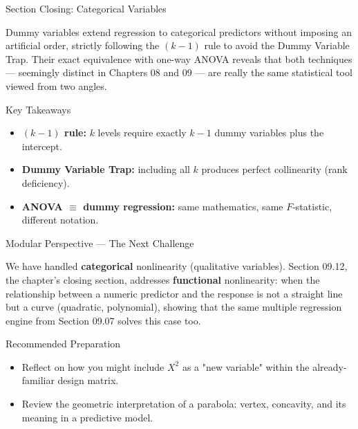 \documentclass[10pt, aspectratio=169]{beamer}
\begin{document}
\begin{frame}{Section Closing: Categorical Variables}
  \begin{reflexion}
    Dummy variables extend regression to categorical predictors without imposing an artificial order, strictly following the $(k-1)$ rule to avoid the Dummy Variable Trap. Their exact equivalence with one-way ANOVA reveals that both techniques --- seemingly distinct in Chapters 08 and 09 --- are really the same statistical tool viewed from two angles.
  \end{reflexion}

  \vspace{0.2cm}
  \pause
  \begin{block}{Key Takeaways}
    \begin{itemize}\itemsep=0.08cm
      \item \textbf{$(k-1)$ rule:} $k$ levels require exactly $k-1$ dummy variables plus the intercept.
      \item \textbf{Dummy Variable Trap:} including all $k$ produces perfect collinearity (rank deficiency).
      \item \textbf{ANOVA $\equiv$ dummy regression:} same mathematics, same $F$-statistic, different notation.
    \end{itemize}
  \end{block}
\end{frame}

\begin{frame}{Modular Perspective --- The Next Challenge}
  \scriptsize
  \begin{retoclase}
    We have handled \textbf{categorical} nonlinearity (qualitative variables). Section 09.12, the chapter's closing section, addresses \textbf{functional} nonlinearity: when the relationship between a numeric predictor and the response is not a straight line but a curve (quadratic, polynomial), showing that the same multiple regression engine from Section 09.07 solves this case too.
  \end{retoclase}

  \vspace{0.08cm}
  \pause
  \begin{alertblock}{Recommended Preparation}
    \begin{itemize}\itemsep=0.06cm
      \item Reflect on how you might include $X^2$ as a "new variable" within the already-familiar design matrix.
      \item Review the geometric interpretation of a parabola: vertex, concavity, and its meaning in a predictive model.
    \end{itemize}
  \end{alertblock}
\end{frame}
\end{document}
